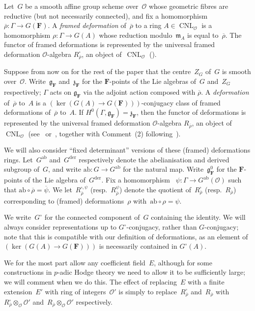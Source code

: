 \documentclass{amsart}
\renewcommand{\mathbb}{\mathbf}
\newcommand{\CNL}{\operatorname{CNL}}
\newcommand{\psibar}{\overline{\psi}}
\newcommand\Gder{G^{\mathrm{der}}}
\newcommand\Gab{G^{\mathrm{ab}}}
\def\fz{\mathfrak{z}}
\def\fg{\mathfrak{g}}
\theoremstyle{definition}
\theoremstyle{remark}
\newcommand{\mar}[1]{}
\newcommand{\mar}[1]{\marginpar{\raggedright\tiny squirrel #1}}
\newcommand{\F}{\FF}
\newcommand{\m}{\frakm}
\newcommand{\FF}{{\mathbb F}}
\newcommand{\cO}{{\mathcal O}}
\newcommand{\frakm}{\mathfrak{m}}
\newcommand{\ab}{\mathrm{ab}}
\newcommand{\rhobar}{\overline{\rho}}
\begin{document}
 Let~$G$ be a smooth affine group scheme over~$\cO$ whose geometric fibres are reductive (but not necessarily connected), and fix a
homomorphism $\rhobar:\Gamma\to G(\F)$.  A \emph{framed deformation}
of~$\rhobar$ to a ring $A\in\CNL_\cO$ is a homomorphism
$\rho:\Gamma\to G(A)$ whose reduction modulo~$\m_A$ is equal
to~$\rhobar$. The functor of framed deformations is represented by the
universal framed deformation $\cO$-algebra $R^{\square}_{\rhobar}$, an
object of~$\CNL_\cO$ (\cite[Thm.\ 1.2.2]{MR3152673}). 

Suppose from now on for the rest of the paper that the centre~$Z_G$
of~$G$ is smooth over~$\cO$. Write~$\fg_\F$ and~$\fz_\F$ for the
$\F$-points of the Lie algebras of~$G$ and~$Z_G$ respectively; $\Gamma$ acts on $\fg_\F$ via the adjoint action composed with $\rhobar$.
  A \emph{deformation} of~$\rhobar$ to~$A$
is a $(\ker(G(A)\to G(\F)))$-conjugacy class of framed deformations
of~$\rhobar$ to~$A$. If $H^0(\Gamma,\fg_\F)=\fz_\F$, then the functor
of deformations is represented by the universal framed deformation
$\cO$-algebra $R_{\rhobar}$, an object of~$\CNL_\cO$ (see~\cite[Thm.\
1.2.2]{MR3152673} or~\cite[Thm.\ 3.3]{MR1643682}, together with
Comment~(2) following~\cite[Thm.\ 3.3]{MR1643682}).%

We will also consider ``fixed determinant'' versions of these (framed)
deformations rings.  Let~$\Gab$ and~$\Gder$ respectively denote the
abelianisation and derived subgroup of~$G$, and write $\ab:G\to\Gab$
for the natural map. Write~$\fg^0_\F$ for the
$\F$-points of the Lie algebra of~$\Gder$. Fix a homomorphism ~$\psi:\Gamma\to\Gab(\cO)$
such that $\ab\circ\rhobar=\psibar$. We
let~$R_{\rhobar}^{\square,\psi}$ (resp.\ $R_{\rhobar}^\psi$) denote
the quotient of~$R^\square_{\rhobar}$ (resp.\ $R_{\rhobar}$)
corresponding to (framed) deformations~$\rho$
with~$\ab\circ\rho=\psi$. 

We write~$G^\circ$ for the connected
component of~$G$ containing the identity. We will always consider
representations up to $G^\circ$-conjugacy, rather than $G$-conjugacy;
note that this is compatible with our definition of deformations, as
an element of $(\ker(G(A)\to G(\F)))$ is necessarily contained in
$G^\circ(A)$. %

We for the most part allow any coefficient field~$E$, although for
some constructions in $p$-adic Hodge theory we need to allow it to be
sufficiently large; we will comment when we do this. The effect of
replacing~$E$ with a finite extension~$E'$ with ring of
integers~$\cO'$ is simply to replace~$R_{\rhobar}^\square$ and~$R_{\rhobar}$
with~$R_{\rhobar}^\square\otimes_{\cO}\cO'$
and~$R_{\rhobar}\otimes_{\cO}\cO'$ respectively.
\end{document}
